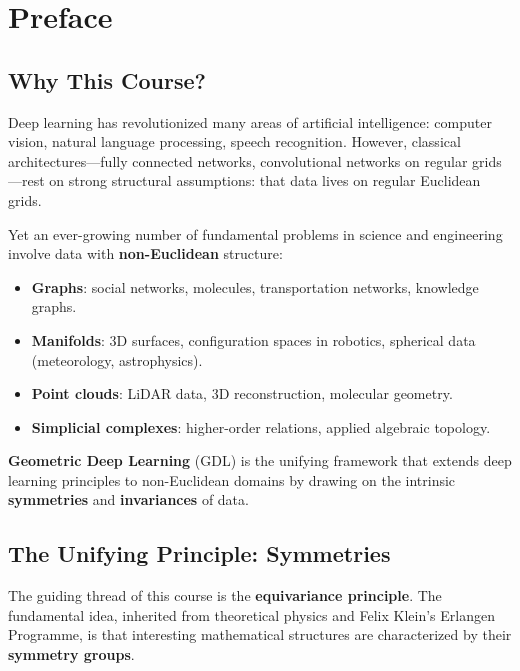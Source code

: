 \chapter*{Preface}

\section*{Why This Course?}

Deep learning has revolutionized many areas of artificial intelligence: computer
vision, natural language processing, speech recognition. However, classical
architectures---fully connected networks, convolutional networks on regular
grids---rest on strong structural assumptions: that data lives on regular
Euclidean grids.

Yet an ever-growing number of fundamental problems in science and engineering
involve data with \textbf{non-Euclidean} structure:
\begin{itemize}
    \item \textbf{Graphs}: social networks, molecules, transportation networks,
          knowledge graphs.
    \item \textbf{Manifolds}: 3D surfaces, configuration spaces in robotics,
          spherical data (meteorology, astrophysics).
    \item \textbf{Point clouds}: LiDAR data, 3D reconstruction, molecular geometry.
    \item \textbf{Simplicial complexes}: higher-order relations, applied algebraic
          topology.
\end{itemize}

\textbf{Geometric Deep Learning} (GDL) is the unifying framework that extends
deep learning principles to non-Euclidean domains by drawing on the intrinsic
\textbf{symmetries} and \textbf{invariances} of data.

\section*{The Unifying Principle: Symmetries}

The guiding thread of this course is the \textbf{equivariance principle}. The
fundamental idea, inherited from theoretical physics and Felix Klein's Erlangen
Programme, is that interesting mathematical structures are characterized by their
\textbf{symmetry groups}.

